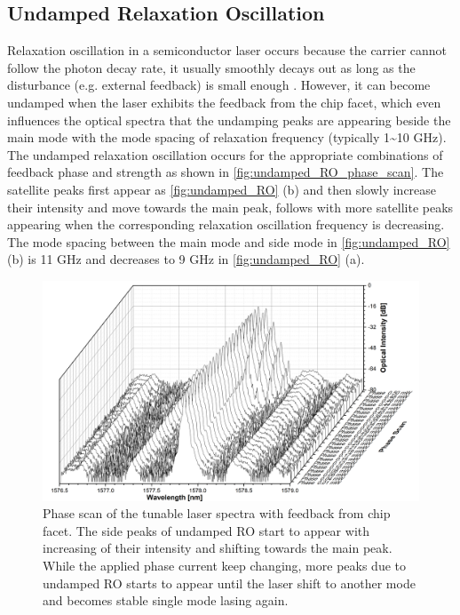 \subsection{Undamped Relaxation Oscillation}\label{subsec:undamped_RO}
Relaxation oscillation in a semiconductor laser occurs because the carrier cannot follow the photon decay rate, it usually smoothly decays out as long as the disturbance (e.g. external feedback) is small enough \cite{ohtsubo2012semiconductor}. However, it can become undamped when the laser exhibits the feedback from the chip facet, which even influences the optical spectra that the undamping peaks are appearing beside the main mode with the mode spacing of relaxation frequency (typically 1\textasciitilde{}10 GHz). The undamped relaxation oscillation occurs for the appropriate combinations of feedback phase and strength as shown in \autoref{fig:undamped_RO_phase_scan}. The satellite peaks first appear as \autoref{fig:undamped_RO} (b) and then slowly increase their intensity and move towards the main peak, follows with more satellite peaks appearing when the corresponding relaxation oscillation frequency is decreasing. The mode spacing between the main mode and side mode in \autoref{fig:undamped_RO} (b) is 11 GHz and decreases to 9 GHz in \autoref{fig:undamped_RO} (a).
\begin{figure}[ht]
    \centering
    \includegraphics[width=.8\linewidth]{figures/Undamped_RO_phase_scan_grating_4621.png}
    \caption{Phase scan of the tunable laser spectra with feedback from chip facet. The side peaks of undamped RO start to appear with increasing of their intensity and shifting towards the main peak. While the applied phase current keep changing, more peaks due to undamped RO starts to appear until the laser shift to another mode and becomes stable single mode lasing again.}
    \label{fig:undamped_RO_phase_scan}
\end{figure}




